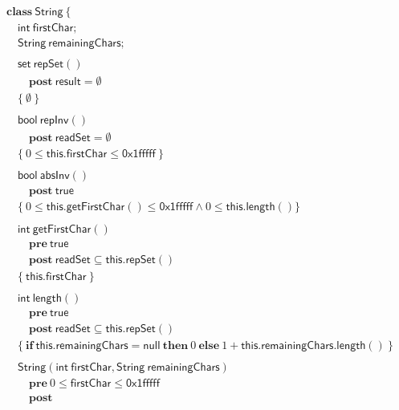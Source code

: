 \documentclass{article}
\begin{document}
$$\begin{array}{l}
\mathbf{class}\ \mathsf{String}\ \{\\
\quad \mathsf{int}\ \mathsf{firstChar};\\
\quad \mathsf{String}\ \mathsf{remainingChars};\\
\\
\quad \mathsf{set}\ \mathsf{repSet}()\\
\quad\quad \mathbf{post}\ \mathsf{result} = \emptyset\\
\quad \{\ \emptyset\ \}\\
\\
\quad \mathsf{bool}\ \mathsf{repInv}()\\
\quad\quad \mathbf{post}\ \mathsf{readSet} = \emptyset\\
\quad \{\ 0 \le \mathsf{this}.\mathsf{firstChar} \le \mathsf{0x1fffff}\ \}\\
\\
\quad \mathsf{bool}\ \mathsf{absInv}()\\
\quad\quad \mathbf{post}\ \mathsf{true}\\
\quad \{\ 0 \le \mathsf{this}.\mathsf{getFirstChar}() \le \mathsf{0x1fffff} \land 0 \le \mathsf{this}.\mathsf{length}() \}\\
\\
\quad \mathsf{int}\ \mathsf{getFirstChar}()\\
\quad\quad \mathbf{pre}\ \mathsf{true}\\
\quad\quad \mathbf{post}\ \mathsf{readSet} \subseteq \mathsf{this}.\mathsf{repSet}()\\
\quad \{\ \mathsf{this}.\mathsf{firstChar}\ \}\\
\\
\quad \mathsf{int}\ \mathsf{length}()\\
\quad\quad \mathbf{pre}\ \mathsf{true}\\
\quad\quad \mathbf{post}\ \mathsf{readSet} \subseteq \mathsf{this}.\mathsf{repSet}()\\
\quad \{\ \mathbf{if}\ \mathsf{this}.\mathsf{remainingChars} = \mathsf{null}\ \mathbf{then}\ 0\ \mathbf{else}\ 1 + \mathsf{this}.\mathsf{remainingChars}.\mathsf{length}()\ \}\\
\\
\quad \mathsf{String}(\mathsf{int}\ \mathsf{firstChar}, \mathsf{String}\ \mathsf{remainingChars})\\
\quad\quad \mathbf{pre}\ 0 \le \mathsf{firstChar} \le \mathsf{0x1fffff}\\
\quad\quad \mathbf{post}\\

\end{array}$$
\end{document}
